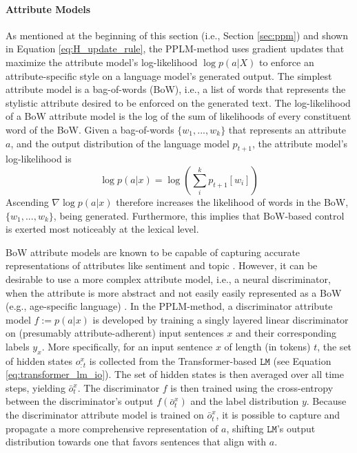 \paragraph{Attribute Models} As mentioned at the beginning of this section (i.e., Section \ref{sec:ppm}) and shown in Equation \ref{eq:H_update_rule}, the PPLM-method uses gradient updates that maximize the attribute model's log-likelihood $\log p(a | X)$ to enforce an attribute-specific style on a language model's generated output.
The simplest attribute model is a bag-of-words (BoW), i.e., a list of words that represents the stylistic attribute desired to be enforced on the generated text.
The log-likelihood of a BoW attribute model is the log of the sum of likelihoods of every constituent word of the BoW.
Given a bag-of-words $\{w_1, ..., w_k\}$ that represents an attribute $a$, and the output distribution of the language model $p_{t + 1}$, the attribute model's log-likelihood is
\begin{equation}
    \log p(a | x) = \log \left( \sum_{i}^{k} p_{t + 1} [w_i] \right)
    \label{eq:bow_att_model_loglikelihood}
\end{equation}
Ascending $\nabla \log p(a | x)$ therefore increases the likelihood of words in the BoW, $\{w_1, ..., w_k\}$, being generated. Furthermore, this implies that BoW-based control is exerted most noticeably at the lexical level.

BoW attribute models are known to be capable of capturing accurate representations of attributes like sentiment and topic \citep{li-etal-2018-delete}.
However, it can be desirable to use a more complex attribute model, i.e., a neural discriminator, when the attribute is more abstract and not easily easily represented as a BoW (e.g., age-specific language) \citep{dathathri2019plug}.
In the PPLM-method, a discriminator attribute model $f := p(a | x)$ is developed by training a singly layered linear discriminator on (presumably attribute-adherent) input sentences $x$ and their corresponding labels $y_x$. More specifically, for an input sentence $x$ of length (in tokens) $t$, the set of hidden states $o_{:t}^{x}$ is collected from the Transformer-based $\texttt{LM}$ (see Equation \ref{eq:transformer_lm_io}).
The set of hidden states is then averaged over all time steps, yielding $\bar{o}_t^x$.
The discriminator $f$ is then trained using the cross-entropy between the discriminator's output $f(\bar{o}_t^x)$ and the label distribution $y$. Because the discriminator attribute model is trained on $\bar{o}_t^x$, it is possible to capture and propagate a more comprehensive representation of $a$, shifting $\texttt{LM}$'s output distribution towards one that favors sentences that align with $a$.

